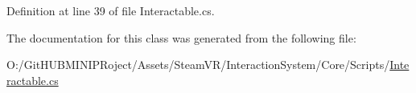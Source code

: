 Definition at line 39 of file Interactable.\+cs.



The documentation for this class was generated from the following file\+:\begin{DoxyCompactItemize}
\item 
O\+:/\+Git\+H\+U\+B\+M\+I\+N\+I\+P\+Roject/\+Assets/\+Steam\+V\+R/\+Interaction\+System/\+Core/\+Scripts/\mbox{\hyperlink{_interactable_8cs}{Interactable.\+cs}}\end{DoxyCompactItemize}
